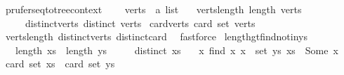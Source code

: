 \begin{isabellebody}
\isanewline
\isanewline
{}\isamarkupfalse%
\ prufer{\isacharunderscore}{\kern0pt}seq{\isacharunderscore}{\kern0pt}to{\isacharunderscore}{\kern0pt}tree{\isacharunderscore}{\kern0pt}context\ {\isacharequal}{\kern0pt}\isanewline
\ \ \ verts\ {\isacharcolon}{\kern0pt}{\isacharcolon}{\kern0pt}\ {\isachardoublequoteopen}{\isacharprime}{\kern0pt}a\ list{\isachardoublequoteclose}\isanewline
\ \ \ verts{\isacharunderscore}{\kern0pt}length{\isacharcolon}{\kern0pt}\ {\isachardoublequoteopen}length\ verts\ {\isasymge}\ {}{\isachardoublequoteclose}\isanewline
\ \ \ \ \ distinct{\isacharunderscore}{\kern0pt}verts{\isacharcolon}{\kern0pt}\ {\isachardoublequoteopen}distinct\ verts{\isachardoublequoteclose}\isanewline
{}\isanewline
\isanewline
{}\isamarkupfalse%
\ card{\isacharunderscore}{\kern0pt}verts{\isacharcolon}{\kern0pt}\ {\isachardoublequoteopen}card\ {\isacharparenleft}{\kern0pt}set\ verts{\isacharparenright}{\kern0pt}\ {\isasymge}\ {}{\isachardoublequoteclose}\isanewline
%
\isadelimproof
\ \ %
\endisadelimproof
%
\isatagproof
{}\isamarkupfalse%
\ verts{\isacharunderscore}{\kern0pt}length\ distinct{\isacharunderscore}{\kern0pt}verts\ distinct{\isacharunderscore}{\kern0pt}card\ \isamarkupfalse%
\ fastforce%
\endisatagproof
{\isafoldproof}%
%
\isadelimproof
\isanewline
%
\endisadelimproof
\isanewline
{}\isamarkupfalse%
\ length{\isacharunderscore}{\kern0pt}gt{\isacharunderscore}{\kern0pt}find{\isacharunderscore}{\kern0pt}not{\isacharunderscore}{\kern0pt}in{\isacharunderscore}{\kern0pt}ys{\isacharcolon}{\kern0pt}\isanewline
\ \ \ {\isachardoublequoteopen}length\ xs\ {\isachargreater}{\kern0pt}\ length\ ys{\isachardoublequoteclose}\isanewline
\ \ \ \ \ {\isachardoublequoteopen}distinct\ xs{\isachardoublequoteclose}\isanewline
\ \ \ {\isachardoublequoteopen}{\isasymexists}x{\isachardot}{\kern0pt}\ find\ {\isacharparenleft}{\kern0pt}{\isasymlambda}x{\isachardot}{\kern0pt}\ x\ {\isasymnotin}\ set\ ys{\isacharparenright}{\kern0pt}\ xs\ {\isacharequal}{\kern0pt}\ Some\ x{\isachardoublequoteclose}\isanewline
%
\isadelimproof
%
\endisadelimproof
%
\isatagproof
{}\isamarkupfalse%
{\isacharminus}{\kern0pt}\isanewline
\ \ \isamarkupfalse%
\ {\isachardoublequoteopen}card\ {\isacharparenleft}{\kern0pt}set\ xs{\isacharparenright}{\kern0pt}\ {\isachargreater}{\kern0pt}\ card\ {\isacharparenleft}{\kern0pt}set\ ys{\isacharparenright}{\kern0pt}{\isachardoublequoteclose}\isanewline

\end{isabellebody}
